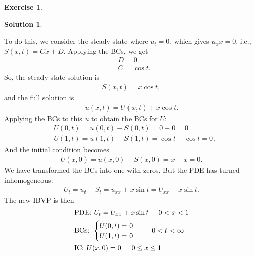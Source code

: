 \documentclass{book}
\theoremstyle{definition}
\newtheorem*{exer*}{Exercise}
\newtheorem*{sln*}{Solution}
\begin{document}
\begin{exer*}
\begin{sln*}
\begin{enumerate}
			To do this, we consider the steady-state where $u_t = 0$, which gives $u_xx = 0$, i.e., $S(x,t) = Cx+D$. Applying the BCs, we get
			\begin{align*}
			&D = 0\\
			&C = \cos t.
			\end{align*}
			So, the steady-state solution is 
			\begin{align*}
			S(x,t) = x\cos t,
			\end{align*}
			and the full solution is
			\begin{align*}
			u(x,t) = U(x,t) + x\cos t.
			\end{align*}
			Applying the BCs to this $u$ to obtain the BCs for $U$:
			\begin{align*}
			&U(0,t) = u(0,t) - S(0,t) = 0-0 = 0\\
			&U(1,t) = u(1,t) - S(1,t) = \cos t - \cos t = 0.
			\end{align*}
			And the initial condition becomes
			\begin{align*}
			U(x,0) = u(x,0) - S(x,0) = x - x = 0.
			\end{align*}
			We have transformed the BCs into one with zeros. But the PDE has turned inhomogeneous: 
			\begin{align*}
			U_t = u_t - S_t = u_{xx} + x\sin t = U_{xx} + x\sin t.
			\end{align*}
			The new IBVP is then
			\begin{align*}
			&\text{PDE: } U_t = U_{xx} + x\sin t \hspace{0.5cm} 0 < x < 1\\
			&\text{BCs: } \begin{cases}
			U(0,t) = 0\\
			U(1,t) = 0
			\end{cases}\hspace{0.5cm} 0 < t < \infty\\
			&\text{IC: } U(x,0) = 0\hspace{0.5cm}0\leq x\leq 1
			\end{align*}
			$\,$\\
			
			
			

\end{enumerate}
\end{sln*}
\end{exer*}
\end{document}
